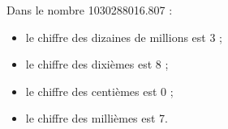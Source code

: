\begin{exemple*1}
   Dans le nombre \num{1 030 288 016.807} :      
   \begin{itemize}
      \item le chiffre des dizaines de millions est 3 ;
      \item le chiffre des dixièmes est 8 ;
      \item le chiffre des centièmes est 0 ;
      \item le chiffre des millièmes est 7.
   \end{itemize}
\end{exemple*1}